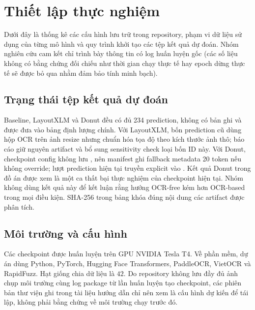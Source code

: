 \section{Thiết lập thực nghiệm}
\label{sec:experiments}

Dưới đây là thống kê các cấu hình lưu trữ trong repository, phạm vi dữ liệu sử dụng của từng mô hình và quy trình khởi tạo các tệp kết quả dự đoán. Nhóm nghiên cứu cam kết chỉ trình bày thông tin có log huấn luyện gốc (các số liệu không có bằng chứng đối chiếu như thời gian chạy thực tế hay epoch dừng thực tế sẽ được bỏ qua nhằm đảm bảo tính minh bạch).

\subsection{Trạng thái tệp kết quả dự đoán}
\label{subsec:artifact-validity}



Baseline, LayoutXLM và Donut đều có đủ 234 prediction, không có bản ghi  và được đưa vào bảng định lượng chính. Với LayoutXLM, bốn prediction cũ dùng hộp OCR trên ảnh resize nhưng chuẩn hóa tọa độ theo kích thước ảnh thô; báo cáo giữ nguyên artifact và bổ sung sensitivity check loại bốn ID này. Với Donut, checkpoint config không lưu , nên manifest ghi fallback metadata 20 token nếu không override; lượt prediction hiện tại truyền explicit  vào . Kết quả Donut trong đồ án được xem là một ca thất bại thực nghiệm của checkpoint hiện tại. Nhóm không dùng kết quả này để kết luận rằng hướng OCR-free kém hơn OCR-based trong mọi điều kiện. SHA-256 trong bảng khóa đúng nội dung các artifact được phân tích.

\subsection{Môi trường và cấu hình}
\label{subsec:exp_env}

Các checkpoint được huấn luyện trên GPU NVIDIA Tesla T4. Về phần mềm, dự án dùng Python, PyTorch, Hugging Face Transformers, PaddleOCR, VietOCR và RapidFuzz. Hạt giống chia dữ liệu là $42$. Do repository không lưu đầy đủ ảnh chụp môi trường cùng log package từ lần huấn luyện tạo checkpoint, các phiên bản thư viện ghi trong tài liệu hướng dẫn chỉ nên xem là cấu hình dự kiến để tái lập, không phải bằng chứng về môi trường chạy trước đó.

